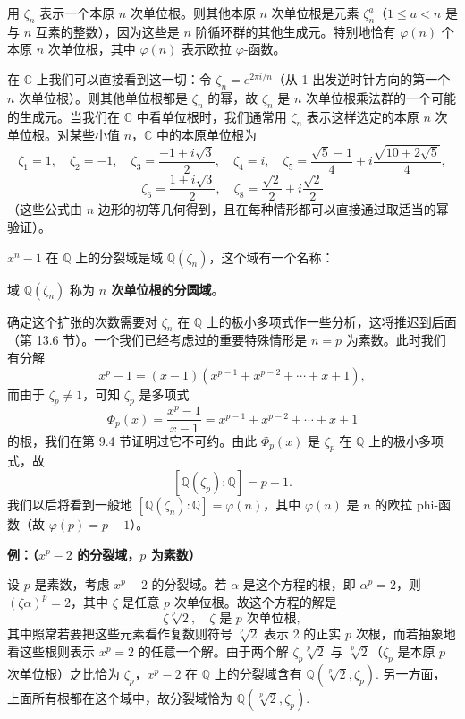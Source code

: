 用 \(\zeta_n\) 表示一个本原 \(n\) 次单位根。则其他本原 \(n\) 次单位根是元素 \(\zeta_n^a\)（\(1 \leq a < n\) 是与 \(n\) 互素的整数），因为这些是 \(n\) 阶循环群的其他生成元。特别地恰有 \(\varphi(n)\) 个本原 \(n\) 次单位根，其中 \(\varphi(n)\) 表示欧拉 \(\varphi\)-函数。

在 \(\mathbb{C}\) 上我们可以直接看到这一切：令 \(\zeta_n = e^{2\pi i/n}\)（从 1 出发逆时针方向的第一个 \(n\) 次单位根）。则其他单位根都是 \(\zeta_n\) 的幂，故 \(\zeta_n\) 是 \(n\) 次单位根乘法群的一个可能的生成元。当我们在 \(\mathbb{C}\) 中看单位根时，我们通常用 \(\zeta_n\) 表示这样选定的本原 \(n\) 次单位根。对某些小值 \(n\)，\(\mathbb{C}\) 中的本原单位根为
\[
\zeta_1 = 1, \quad \zeta_2 = -1, \quad \zeta_3 = \frac{-1+i\sqrt{3}}{2}, \quad \zeta_4 = i, \quad \zeta_5 = \frac{\sqrt{5}-1}{4}+i\frac{\sqrt{10+2\sqrt{5}}}{4},
\]
\[
\zeta_6 = \frac{1+i\sqrt{3}}{2}, \quad \zeta_8 = \frac{\sqrt{2}}{2}+i\frac{\sqrt{2}}{2}
\]
（这些公式由 \(n\) 边形的初等几何得到，且在每种情形都可以直接通过取适当的幂验证）。

\(x^n-1\) 在 \(\mathbb{Q}\) 上的分裂域是域 \(\mathbb{Q}(\zeta_n)\)，这个域有一个名称：

\begin{definition}
域 \(\mathbb{Q}(\zeta_n)\) 称为 \textbf{\(n\) 次单位根的分圆域}。
\end{definition}

确定这个扩张的次数需要对 \(\zeta_n\) 在 \(\mathbb{Q}\) 上的极小多项式作一些分析，这将推迟到后面（第 13.6 节）。一个我们已经考虑过的重要特殊情形是 \(n = p\) 为素数。此时我们有分解
\[
x^p-1 = (x-1)(x^{p-1}+x^{p-2}+\cdots+x+1),
\]
而由于 \(\zeta_p \neq 1\)，可知 \(\zeta_p\) 是多项式
\[
\Phi_p(x) = \frac{x^p-1}{x-1} = x^{p-1}+x^{p-2}+\cdots+x+1
\]
的根，我们在第 9.4 节证明过它不可约。由此 \(\Phi_p(x)\) 是 \(\zeta_p\) 在 \(\mathbb{Q}\) 上的极小多项式，故
\[
[\mathbb{Q}(\zeta_p):\mathbb{Q}] = p-1.
\]
我们以后将看到一般地 \([\mathbb{Q}(\zeta_n):\mathbb{Q}] = \varphi(n)\)，其中 \(\varphi(n)\) 是 \(n\) 的欧拉 phi-函数（故 \(\varphi(p) = p-1\)）。

\noindent\textbf{例：（\(x^p-2\) 的分裂域，\(p\) 为素数）}

设 \(p\) 是素数，考虑 \(x^p-2\) 的分裂域。若 \(\alpha\) 是这个方程的根，即 \(\alpha^p = 2\)，则 \((\zeta\alpha)^p = 2\)，其中 \(\zeta\) 是任意 \(p\) 次单位根。故这个方程的解是
\[
\zeta\sqrt[p]{2}, \quad \zeta \text{ 是 } p \text{ 次单位根},
\]
其中照常若要把这些元素看作复数则符号 \(\sqrt[p]{2}\) 表示 2 的正实 \(p\) 次根，而若抽象地看这些根则表示 \(x^p = 2\) 的任意一个解。由于两个解 \(\zeta_p\sqrt[p]{2}\) 与 \(\sqrt[p]{2}\)（\(\zeta_p\) 是本原 \(p\) 次单位根）之比恰为 \(\zeta_p\)，\(x^p-2\) 在 \(\mathbb{Q}\) 上的分裂域含有 \(\mathbb{Q}(\sqrt[p]{2}, \zeta_p)\). 另一方面，上面所有根都在这个域中，故分裂域恰为 \(\mathbb{Q}(\sqrt[p]{2}, \zeta_p)\).

